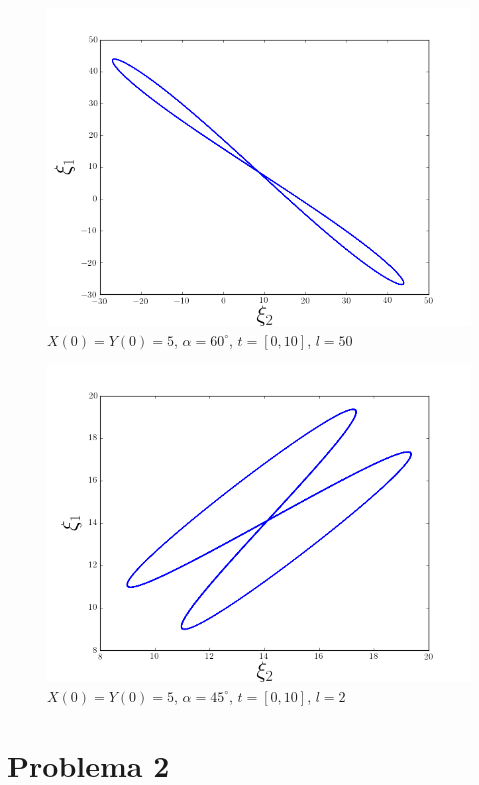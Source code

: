 \documentclass[a4paper,10pt]{article}
\numberwithin{equation}{section}
\begin{document}
\begin{figure}[H]
 \center 
 \includegraphics[scale=0.5]{problema1fig9}
 \caption{$X(0) = Y(0) = 5$, $\alpha = 60^\circ$, $t = [0,10]$, $l = 50$}
 \label{problema1fig9}
\end{figure}

\begin{figure}[H]
 \center 
 \includegraphics[scale=0.5]{problema1fig10}
 \caption{$X(0) = Y(0) = 5$, $\alpha = 45^\circ$, $t = [0,10]$, $l = 2$}
 \label{problema1fig10}
\end{figure}







\section{Problema 2}
\end{document}
